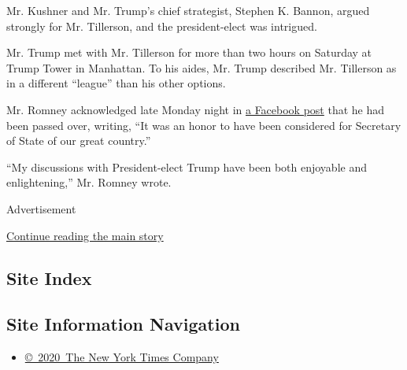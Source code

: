 Mr. Kushner and Mr. Trump's chief strategist, Stephen K. Bannon, argued
strongly for Mr. Tillerson, and the president-elect was intrigued.

Mr. Trump met with Mr. Tillerson for more than two hours on Saturday at
Trump Tower in Manhattan. To his aides, Mr. Trump described Mr.
Tillerson as in a different ``league'' than his other options.

Mr. Romney acknowledged late Monday night in
\href{https://www.facebook.com/mittromney/posts/10153988122401121}{a
Facebook post} that he had been passed over, writing, ``It was an honor
to have been considered for Secretary of State of our great country.''

``My discussions with President-elect Trump have been both enjoyable and
enlightening,'' Mr. Romney wrote.

Advertisement

\protect\hyperlink{after-bottom}{Continue reading the main story}

\hypertarget{site-index}{%
\subsection{Site Index}\label{site-index}}

\hypertarget{site-information-navigation}{%
\subsection{Site Information
Navigation}\label{site-information-navigation}}

\begin{itemize}
\tightlist
\item
  \href{https://help.nytimes.com/hc/en-us/articles/115014792127-Copyright-notice}{©~2020~The
  New York Times Company}
\end{itemize}

